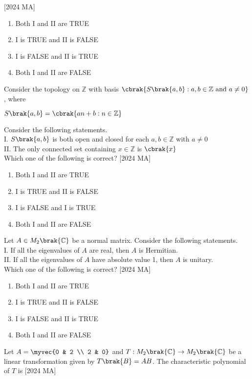 \hfill [2024 MA]
\begin{enumerate}
    \item Both I and II are TRUE 
    \item I is TRUE and II is FALSE 
    \item I is FALSE and II is TRUE 
    \item Both I and II are FALSE
\end{enumerate}
\item Consider the topology on $\mathbb{Z}$ with basis $\cbrak{S\brak{a,b} : a,b \in \mathbb{Z} \text{
and 
} a \neq 0}$, where 
\begin{center}
    $S\brak{a,b} = \cbrak{an + b: n \in \mathbb{Z}} $
\end{center}
Consider the following statements. \\
I. $S\brak{a,b}$ is both open and closed for each $a,b \in \mathbb{Z}$ with $a \neq 0$\\
II. The only connected set containing $x \in \mathbb{Z}$ is $\cbrak{x}$ \\
Which one of the following is correct? \hfill [2024 MA]
\begin{enumerate}
    \item Both I and II are TRUE
    \item I is TRUE and II is FALSE
    \item I is FALSE and I is TRUE
    \item Both I and II are FALSE
\end{enumerate}
\item Let $A \in  M_2\brak{\mathbb{C}}$ be a normal matrix. Consider the following statements.\\
I. If all the eigenvalues of $A$ are real, then $A$ is Hermitian.\\
II. If all the eigenvalues of $A$ have absolute value 1, then $A$ is unitary.\\
Which one of the following is correct? \hfill [2024 MA]
\begin{enumerate}
    \item Both I and II are TRUE
    \item I is TRUE and II is FALSE
    \item I is FALSE and II is TRUE
    \item Both I and II are FALSE
\end{enumerate}
\item Let $A = \myvec{0 & 2 \\ 2 & 0}$ and $T: M_2\brak{\mathbb{C}} \to M_2 \brak{\mathbb{C}}$ be a linear transformation given by $T\brak{B} = AB$. The characteristic polynomial of $T$ is \hfill [2024 MA]
